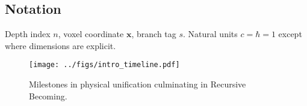 \subsection{Notation}

Depth index $n$, voxel coordinate $\mathbf x$, branch tag $s$.
Natural units $c=\hbar=1$ except where dimensions are explicit.

\begin{figure}[t]
  \centering
  \texttt{[image: ../figs/intro\_timeline.pdf]}
  \caption{Milestones in physical unification culminating in Recursive Becoming.}
  \label{fig:intro-timeline}
\end{figure}

\clearpage
